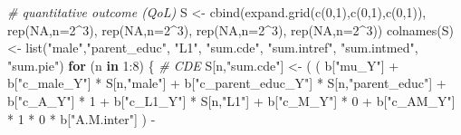 \documentclass[
]{book}
\newenvironment{Shaded}{\begin{snugshade}}{\end{snugshade}}
\newcommand{\AttributeTok}[1]{\textcolor[rgb]{0.77,0.63,0.00}{#1}}
\newcommand{\CommentTok}[1]{\textcolor[rgb]{0.56,0.35,0.01}{\textit{#1}}}
\newcommand{\ConstantTok}[1]{\textcolor[rgb]{0.00,0.00,0.00}{#1}}
\newcommand{\ControlFlowTok}[1]{\textcolor[rgb]{0.13,0.29,0.53}{\textbf{#1}}}
\newcommand{\DecValTok}[1]{\textcolor[rgb]{0.00,0.00,0.81}{#1}}
\newcommand{\FunctionTok}[1]{\textcolor[rgb]{0.00,0.00,0.00}{#1}}
\newcommand{\NormalTok}[1]{#1}
\newcommand{\OtherTok}[1]{\textcolor[rgb]{0.56,0.35,0.01}{#1}}
\newcommand{\SpecialCharTok}[1]{\textcolor[rgb]{0.00,0.00,0.00}{#1}}
\newcommand{\StringTok}[1]{\textcolor[rgb]{0.31,0.60,0.02}{#1}}
\begin{document}
\begin{Shaded}
\begin{Highlighting}[]
  \CommentTok{\# quantitative outcome (QoL)}
\NormalTok{  S }\OtherTok{\textless{}{-}} \FunctionTok{cbind}\NormalTok{(}\FunctionTok{expand.grid}\NormalTok{(}\FunctionTok{c}\NormalTok{(}\DecValTok{0}\NormalTok{,}\DecValTok{1}\NormalTok{),}\FunctionTok{c}\NormalTok{(}\DecValTok{0}\NormalTok{,}\DecValTok{1}\NormalTok{),}\FunctionTok{c}\NormalTok{(}\DecValTok{0}\NormalTok{,}\DecValTok{1}\NormalTok{)), }\FunctionTok{rep}\NormalTok{(}\ConstantTok{NA}\NormalTok{,}\AttributeTok{n=}\DecValTok{2}\SpecialCharTok{\^{}}\DecValTok{3}\NormalTok{), }\FunctionTok{rep}\NormalTok{(}\ConstantTok{NA}\NormalTok{,}\AttributeTok{n=}\DecValTok{2}\SpecialCharTok{\^{}}\DecValTok{3}\NormalTok{), }
             \FunctionTok{rep}\NormalTok{(}\ConstantTok{NA}\NormalTok{,}\AttributeTok{n=}\DecValTok{2}\SpecialCharTok{\^{}}\DecValTok{3}\NormalTok{), }\FunctionTok{rep}\NormalTok{(}\ConstantTok{NA}\NormalTok{,}\AttributeTok{n=}\DecValTok{2}\SpecialCharTok{\^{}}\DecValTok{3}\NormalTok{))}
  \FunctionTok{colnames}\NormalTok{(S) }\OtherTok{\textless{}{-}} \FunctionTok{list}\NormalTok{(}\StringTok{"male"}\NormalTok{,}\StringTok{"parent\_educ"}\NormalTok{, }\StringTok{"L1"}\NormalTok{, }\StringTok{"sum.cde"}\NormalTok{, }\StringTok{"sum.intref"}\NormalTok{, }
                      \StringTok{"sum.intmed"}\NormalTok{, }\StringTok{"sum.pie"}\NormalTok{)}
  \ControlFlowTok{for}\NormalTok{ (n }\ControlFlowTok{in} \DecValTok{1}\SpecialCharTok{:}\DecValTok{8}\NormalTok{) \{}
    \CommentTok{\# CDE }
\NormalTok{    S[n,}\StringTok{"sum.cde"}\NormalTok{] }\OtherTok{\textless{}{-}}\NormalTok{ ( ( b[}\StringTok{"mu\_Y"}\NormalTok{] }\SpecialCharTok{+} 
\NormalTok{                            b[}\StringTok{"c\_male\_Y"}\NormalTok{] }\SpecialCharTok{*}\NormalTok{ S[n,}\StringTok{"male"}\NormalTok{] }\SpecialCharTok{+} 
\NormalTok{                            b[}\StringTok{"c\_parent\_educ\_Y"}\NormalTok{] }\SpecialCharTok{*}\NormalTok{ S[n,}\StringTok{"parent\_educ"}\NormalTok{] }\SpecialCharTok{+} 
\NormalTok{                            b[}\StringTok{"c\_A\_Y"}\NormalTok{] }\SpecialCharTok{*} \DecValTok{1} \SpecialCharTok{+} 
\NormalTok{                            b[}\StringTok{"c\_L1\_Y"}\NormalTok{] }\SpecialCharTok{*}\NormalTok{ S[n,}\StringTok{"L1"}\NormalTok{] }\SpecialCharTok{+}
\NormalTok{                            b[}\StringTok{"c\_M\_Y"}\NormalTok{] }\SpecialCharTok{*} \DecValTok{0} \SpecialCharTok{+}
\NormalTok{                            b[}\StringTok{"c\_AM\_Y"}\NormalTok{] }\SpecialCharTok{*} \DecValTok{1} \SpecialCharTok{*} \DecValTok{0} \SpecialCharTok{*}\NormalTok{ b[}\StringTok{"A.M.inter"}\NormalTok{] ) }\SpecialCharTok{{-}} 

\end{Highlighting}
\end{Shaded}
\end{document}
